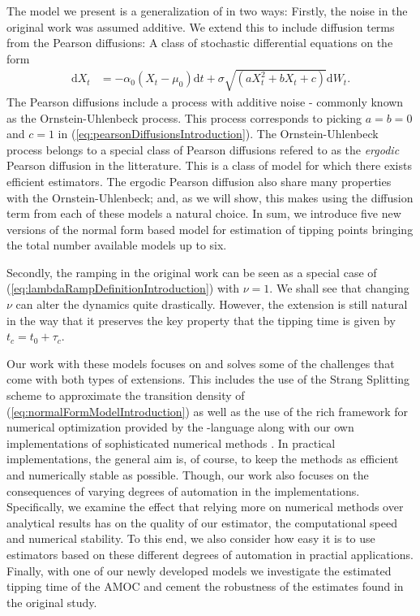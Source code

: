 The model we present is a generalization of \cite[equation (1)]{Ditlevsen2023} in two ways: Firstly, the noise in the original work was assumed additive. We extend this to include diffusion terms from the Pearson diffusions: A class of stochastic differential equations on the form
\begin{align}
    \mathrm{d}X_t &= -\alpha_0\left(X_t - \mu_0\right)\mathrm{d}t + \sigma\sqrt{\left(aX_t^2 + bX_t + c\right)}\mathrm{d}W_t. \label{eq:pearsonDiffusionsIntroduction}
\end{align}
The Pearson diffusions include a process with additive noise - commonly known as the Ornstein-Uhlenbeck process. This process corresponds to picking $a = b = 0$ and $c = 1$ in (\ref{eq:pearsonDiffusionsIntroduction}). The Ornstein-Uhlenbeck process belongs to a special class of Pearson diffusions refered to as the \textit{ergodic} Pearson diffusion in the litterature. This is a class of model for which there exists efficient estimators. The ergodic Pearson diffusion also share many properties with the Ornstein-Uhlenbeck; and, as we will show, this makes using the diffusion term from each of these models a natural choice. In sum, we introduce five new versions of the normal form based model for estimation of tipping points bringing the total number available models up to six.

Secondly, the ramping in the original work \cite[equation (2)]{Ditlevsen2023} can be seen as a special case of (\ref{eq:lambdaRampDefinitionIntroduction}) with $\nu = 1$. We shall see that changing $\nu$ can alter the dynamics quite drastically. However, the extension is still natural in the way that it preserves the key property that the tipping time is given by $t_c = t_0 + \tau_c$.

Our work with these models focuses on and solves some of the challenges that come with both types of extensions. This includes the use of the Strang Splitting scheme\cite{SplittingSchemes} to approximate the transition density of (\ref{eq:normalFormModelIntroduction}) as well as the use of the rich framework for numerical optimization provided by the -language along with our own implementations of sophisticated numerical methods \cite{Rlang}. In practical implementations, the general aim is, of course, to keep the methods as efficient and numerically stable as possible. Though, our work also focuses on the consequences of varying degrees of automation in the implementations. Specifically, we examine the effect that relying more on numerical methods over analytical results has on the quality of our estimator, the computational speed and numerical stability. To this end, we also consider how easy it is to use estimators based on these different degrees of automation in practial applications. Finally, with one of our newly developed models we investigate the estimated tipping time of the AMOC and cement the robustness of the estimates found in the original study.
